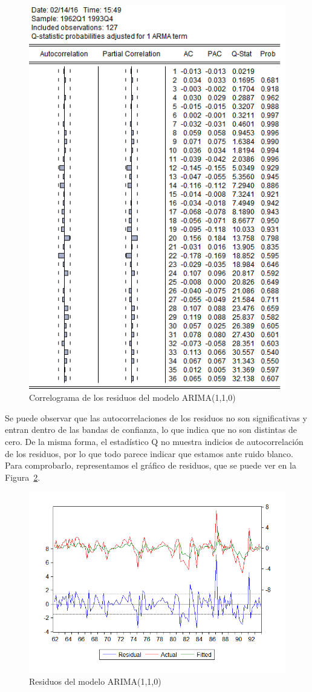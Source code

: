 \documentclass[12pt,a4paper,twoside,openright,titlepage,final]{article}
\begin{document}
\begin{figure}[tbph!]
	\centering
	\includegraphics[width=0.7\linewidth]{imagenes/empleo/modelo1-residuos-correlograma.png}
	\caption{Correlograma de los residuos del modelo ARIMA(1,1,0)}
	\label{fig:modelo1-residuos-correlograma}
\end{figure}

Se puede observar que las autocorrelaciones de los residuos no son significativas y entran dentro de las bandas de confianza, lo que indica que no son distintas de cero. De la misma forma, el estadístico Q no muestra indicios de autocorrelación de los residuos, por lo que todo parece indicar que estamos ante ruido blanco. Para comprobarlo, representamos el gráfico de residuos, que se puede ver en la Figura~\ref{fig:modelo1-residuos}.\\

\begin{figure}[tbph!]
	\centering
	\includegraphics[width=0.7\linewidth]{imagenes/empleo/modelo1-residuos.png}
	\caption{Residuos del modelo ARIMA(1,1,0)}
	\label{fig:modelo1-residuos}
\end{figure}
\end{document}
